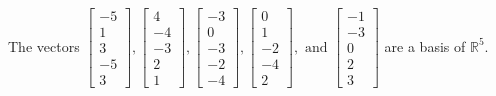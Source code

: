 \begin{exercise}
\begin{exerciseStatement}
  \end{exerciseStatement}
  \begin{exerciseAnswer}
   The vectors \(\left[\begin{array}{r}
-5 \\
1 \\
3 \\
-5 \\
3
\end{array}\right] , \left[\begin{array}{r}
4 \\
-4 \\
-3 \\
2 \\
1
\end{array}\right] , \left[\begin{array}{r}
-3 \\
0 \\
-3 \\
-2 \\
-4
\end{array}\right] , \left[\begin{array}{r}
0 \\
1 \\
-2 \\
-4 \\
2
\end{array}\right] , \text{ and } \left[\begin{array}{r}
-1 \\
-3 \\
0 \\
2 \\
3
\end{array}\right]\) 
  	 are  a basis of \(\mathbb{R}^5\).
  


  \end{exerciseAnswer}
\end{exercise}